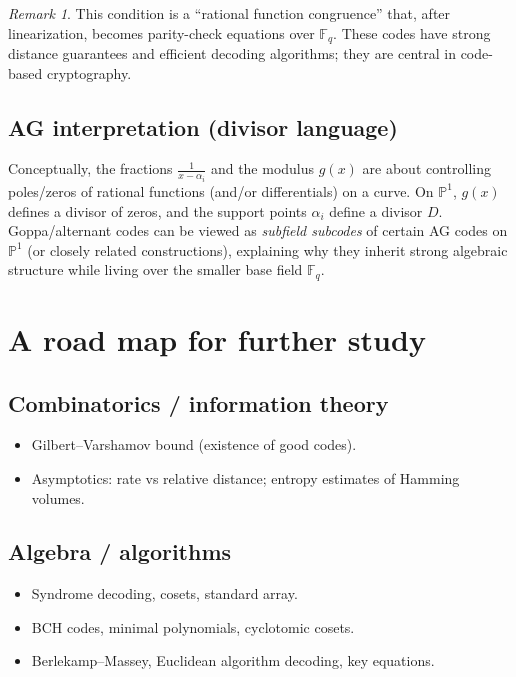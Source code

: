\documentclass[11pt]{article}
\theoremstyle{definition}
\theoremstyle{remark}
\newtheorem{remark}[theorem]{Remark}
\newcommand{\F}{\mathbb{F}}
\newcommand{\PP}{\mathbb{P}}
\begin{document}
	\begin{remark}
		This condition is a ``rational function congruence'' that, after linearization, becomes parity-check equations over \(\F_q\).
		These codes have strong distance guarantees and efficient decoding algorithms; they are central in code-based cryptography.
	\end{remark}
	
	\subsection{AG interpretation (divisor language)}
	Conceptually, the fractions \(\frac{1}{x-\alpha_i}\) and the modulus \(g(x)\) are about controlling poles/zeros of rational functions (and/or differentials) on a curve.
	On \(\PP^1\), \(g(x)\) defines a divisor of zeros, and the support points \(\alpha_i\) define a divisor \(D\).
	Goppa/alternant codes can be viewed as \emph{subfield subcodes} of certain AG codes on \(\PP^1\) (or closely related constructions),
	explaining why they inherit strong algebraic structure while living over the smaller base field \(\F_q\).
	
	\section{A road map for further study}
	\subsection{Combinatorics / information theory}
	\begin{itemize}
		\item Gilbert--Varshamov bound (existence of good codes).
		\item Asymptotics: rate vs relative distance; entropy estimates of Hamming volumes.
	\end{itemize}
	
	\subsection{Algebra / algorithms}
	\begin{itemize}
		\item Syndrome decoding, cosets, standard array.
		\item BCH codes, minimal polynomials, cyclotomic cosets.
		\item Berlekamp--Massey, Euclidean algorithm decoding, key equations.
	\end{itemize}
	
\end{document}
